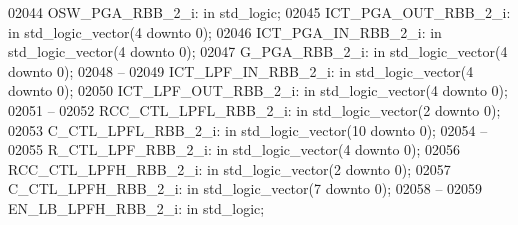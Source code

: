 \begin{DoxyCode}
02044     OSW\_PGA\_RBB\_2\_i:    \textcolor{keywordflow}{in} \textcolor{comment}{std\_logic};
02045     ICT\_PGA\_OUT\_RBB\_2\_i:    \textcolor{keywordflow}{in} \textcolor{comment}{std\_logic\_vector}(\textcolor{vhdllogic}{}\textcolor{vhdllogic}{4} \textcolor{keywordflow}{downto} \textcolor{vhdllogic}{}\textcolor{vhdllogic}{0});
02046     ICT\_PGA\_IN\_RBB\_2\_i: \textcolor{keywordflow}{in} \textcolor{comment}{std\_logic\_vector}(\textcolor{vhdllogic}{}\textcolor{vhdllogic}{4} \textcolor{keywordflow}{downto} \textcolor{vhdllogic}{}\textcolor{vhdllogic}{0});
02047     G\_PGA\_RBB\_2\_i:  \textcolor{keywordflow}{in} \textcolor{comment}{std\_logic\_vector}(\textcolor{vhdllogic}{}\textcolor{vhdllogic}{4} \textcolor{keywordflow}{downto} \textcolor{vhdllogic}{}\textcolor{vhdllogic}{0});
02048 \textcolor{keyword}{    --}
02049     ICT\_LPF\_IN\_RBB\_2\_i: \textcolor{keywordflow}{in} \textcolor{comment}{std\_logic\_vector}(\textcolor{vhdllogic}{}\textcolor{vhdllogic}{4} \textcolor{keywordflow}{downto} \textcolor{vhdllogic}{}\textcolor{vhdllogic}{0});
02050     ICT\_LPF\_OUT\_RBB\_2\_i:    \textcolor{keywordflow}{in} \textcolor{comment}{std\_logic\_vector}(\textcolor{vhdllogic}{}\textcolor{vhdllogic}{4} \textcolor{keywordflow}{downto} \textcolor{vhdllogic}{}\textcolor{vhdllogic}{0});
02051 \textcolor{keyword}{    --}
02052     RCC\_CTL\_LPFL\_RBB\_2\_i:   \textcolor{keywordflow}{in} \textcolor{comment}{std\_logic\_vector}(\textcolor{vhdllogic}{}\textcolor{vhdllogic}{2} \textcolor{keywordflow}{downto} \textcolor{vhdllogic}{}\textcolor{vhdllogic}{0});
02053     C\_CTL\_LPFL\_RBB\_2\_i: \textcolor{keywordflow}{in} \textcolor{comment}{std\_logic\_vector}(\textcolor{vhdllogic}{}\textcolor{vhdllogic}{10} \textcolor{keywordflow}{downto} \textcolor{vhdllogic}{}\textcolor{vhdllogic}{0});
02054 \textcolor{keyword}{    --}
02055     R\_CTL\_LPF\_RBB\_2\_i:  \textcolor{keywordflow}{in} \textcolor{comment}{std\_logic\_vector}(\textcolor{vhdllogic}{}\textcolor{vhdllogic}{4} \textcolor{keywordflow}{downto} \textcolor{vhdllogic}{}\textcolor{vhdllogic}{0});
02056     RCC\_CTL\_LPFH\_RBB\_2\_i:   \textcolor{keywordflow}{in} \textcolor{comment}{std\_logic\_vector}(\textcolor{vhdllogic}{}\textcolor{vhdllogic}{2} \textcolor{keywordflow}{downto} \textcolor{vhdllogic}{}\textcolor{vhdllogic}{0});
02057     C\_CTL\_LPFH\_RBB\_2\_i: \textcolor{keywordflow}{in} \textcolor{comment}{std\_logic\_vector}(\textcolor{vhdllogic}{}\textcolor{vhdllogic}{7} \textcolor{keywordflow}{downto} \textcolor{vhdllogic}{}\textcolor{vhdllogic}{0});
02058 \textcolor{keyword}{    --}
02059     EN\_LB\_LPFH\_RBB\_2\_i: \textcolor{keywordflow}{in} \textcolor{comment}{std\_logic};

\end{DoxyCode}
